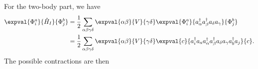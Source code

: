 For the two-body part, we have
\begin{align*}
    \expval{\Phi_i^a}{\hat{H}_I}{\Phi_j^b} &= \frac{1}{2} \sum_{\alpha\beta\gamma\delta} \expval{\alpha\beta}{V}{\gamma\delta} \expval{\Phi_i^a}{a_\alpha^\dagger a_\beta^\dagger a_\delta a_\gamma}{\Phi_j^b} \\
    &= \frac{1}{2} \sum_{\alpha\beta\gamma\delta} \expval{\alpha\beta}{V}{\gamma\delta} \expval{c}{a_i^\dagger a_a a_\alpha^\dagger a_\beta^\dagger a_\delta a_\gamma a_b^\dagger a_j}{c}.  \\
\end{align*}
The possible contractions are then

